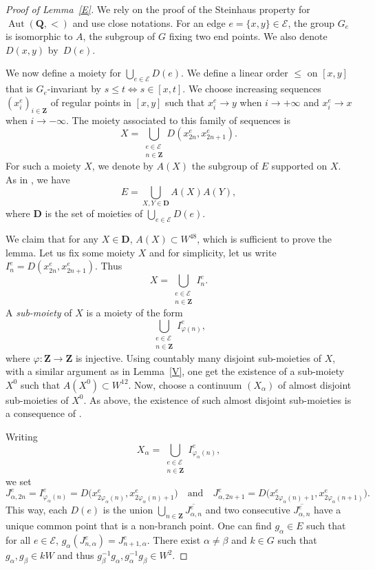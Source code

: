 \documentclass[JEP,XML,SOM,Unicode,NoFloatCountersInSection]{cedram}
\let\mathcal\mathscr
\theoremstyle{plain}
\theoremstyle{definition}
\newcommand{\bD}{{\boldsymbol{D}}}
\newcommand{\ZZ}{\mathbf{Z}}
\newcommand{\QQ}{\mathbf{Q}}
\newcommand{\cE}{\mathcal{E}}
\DeclareMathOperator{\Aut}{Aut}
\begin{document}
\begin{proof}[Proof of Lemma~\ref{E}] We rely on the proof of the Steinhaus property for $\Aut(\QQ,<)$ \cite[Th.\,15]{Rosendal-Solecki} and use close notations. For an edge $e=\{x,y\}\in\cE$, the group $G_e$ is isomorphic to $A$, the subgroup of $G$ fixing two end points. We also denote $D(x,y)$ by~$D(e)$.

We now define a moiety for $\bigcup_{e\in\cE}D(e)$. We define a linear order $\leq$ on $[x,y]$ that is $G_e$-invariant by $s\leq t\Leftrightarrow s\in[x,t]$. We choose increasing sequences $(x^e_i)_{i\in\ZZ}$ of regular points in $[x,y]$ such that $x^e_i\to y$ when $i\to+\infty$ and $x^e_i\to x$ when $i\to-\infty$. The moiety associated to this family of sequences is
\[
X=\bigcup_{\substack{e\in\cE\\n\in\ZZ}}D(x^e_{2n},x^e_{2n+1}).
\]
For such a moiety $X$, we denote by $A(X)$ the subgroup of $E$ supported on $X$. As in \cite[Lem.\,16]{Rosendal-Solecki}, we have
\[
E=\bigcup_{X,Y\in\bD} A(X)A(Y),
\]
where $\bD$ is the set of moieties of $\bigcup_{e\in\cE}D(e)$.

We claim that for any $X\in\bD$, $A(X)\subset W^{48}$, which is sufficient to prove the lemma. Let us fix some moiety $X$ and for simplicity, let us write $I_n^e=D(x^e_{2n},x^e_{2n+1})$. Thus
\[
X=\bigcup_{\substack{e\in\cE\\n\in\ZZ}}I_n^e.
\]
A \emph{sub-moiety} of $X$ is a moiety of the form
\[
\bigcup_{\substack{e\in\cE\\n\in\ZZ}}I^e_{\varphi(n)},
\]
where $\varphi\colon\ZZ\to\ZZ$ is injective. Using countably many disjoint sub-moieties of $X$, with a similar argument as in Lemma~\ref{V}, one get the existence of a sub-moiety $X^0$ such that $A(X^0)\subset W^{12}$. Now, choose a continuum $(X_\alpha)$ of almost disjoint sub-moieties of $X^0$. As above, the existence of such almost disjoint sub-moieties is a consequence of \cite{MR1549531}.

Writing
\[
X_\alpha=\bigcup_{\substack{e\in\cE\\n\in\ZZ}}I^e_{\varphi_\alpha(n)},
\]
we set
\[
J_{\alpha,2n}^e=I^e_{\varphi_\alpha(n)}=D\bigl(x^e_{2\varphi_\alpha(n)},x^e_{2\varphi_\alpha(n)+1}\bigr)\quad \text{and}\quad J_{\alpha,2n+1}^e=D\bigl(x^e_{2\varphi_\alpha(n)+1},x^e_{2\varphi_\alpha(n+1)}\bigr).
\]
This way, each $D(e)$ is the union $\bigcup_{n\in\ZZ}\overline{J^e_{\alpha,n}}$ and two consecutive $\overline{J^e_{\alpha,n}}$ have a unique common point that is a non-branch point. One can find $g_\alpha\in E$ such that for all $e\in\cE$, $g_\alpha(J_{n,\alpha}^e)=J^e_{n+1,\alpha}$. There exist $\alpha\ne\beta$ and $k\in G$ such that $g_\alpha,g_\beta\in kW$ and thus $g_\beta^{-1}g_\alpha,g_\alpha^{-1}g_\beta\in W^2$.


\end{proof}
\end{document}
